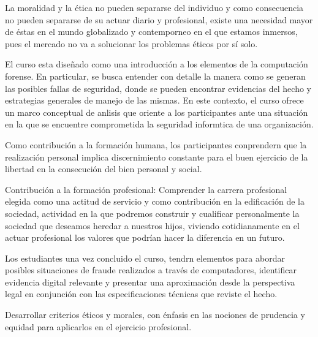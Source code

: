 \begin{syllabus}


\begin{justification}
La moralidad y la ética no pueden separarse del individuo y como consecuencia
no pueden separarse de su actuar diario y profesional, existe una necesidad 
mayor de éstas en el mundo globalizado y contemporneo en el que estamos inmersos, 
pues el mercado no va a solucionar los problemas éticos por sí solo.

El curso esta diseñado como una introducción a los elementos de la computación forense. 
En particular, se busca entender con detalle la manera como se generan las posibles 
fallas de seguridad, donde se pueden encontrar evidencias del hecho y estrategias 
generales de manejo de las mismas. En este contexto, el curso ofrece un marco 
conceptual de anlisis que oriente a los participantes ante una situación en la 
que se encuentre comprometida la seguridad informtica de una organización.

Como contribución a la formación humana, los participantes conprendern que la 
realización personal implica discernimiento constante para el buen ejercicio 
de la libertad en la consecución del bien personal y social.

Contribución a la formación profesional: Comprender la carrera profesional 
elegida como una actitud de servicio y como contribución en la edificación 
de la sociedad, actividad en la que podremos construir y cualificar personalmente 
la sociedad que deseamos heredar a nuestros hijos, viviendo cotidianamente 
en el actuar profesional los valores que podrían hacer la diferencia en un futuro.

Los estudiantes una vez concluido el curso, tendrn elementos para abordar 
posibles situaciones de fraude realizados a través de computadores, 
identificar evidencia digital relevante y presentar una aproximación desde la 
perspectiva legal en conjunción con las especificaciones técnicas que reviste 
el hecho.
\end{justification}

\begin{goals}
\item Desarrollar criterios éticos y morales, con énfasis en las nociones de prudencia y equidad para aplicarlos en el ejercicio profesional.
\end{goals}

\begin{outcomes}
\end{outcomes}


\end{syllabus}
